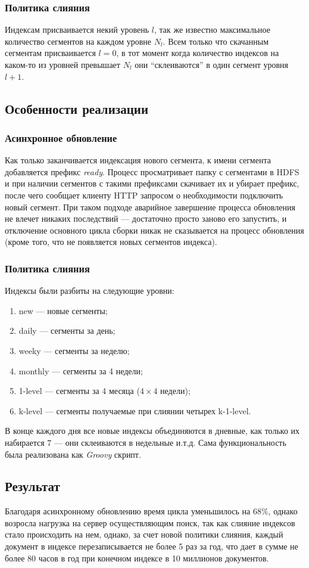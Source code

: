 \subsubsection{Политика слияния}
Индексам присваивается некий уровень $l$, так же известно максимальное количество сегментов на каждом уровне $N_{l}$. Всем только что скачанным сегментам присваивается $l=0$, в тот момент когда количество индексов на каком-то из уровней превышает $N_{l}$ они ``склеиваются'' в один сегмент уровня $l+1$.
\subsection{Особенности реализации}
\subsubsection{Асинхронное обновление}
Как только заканчивается индексация нового сегмента, к имени сегмента добавляется префикс \textit{ready}. Процесс просматривает папку с сегментами в HDFS и при наличии сегментов с такими префиксами скачивает их и убирает префикс, после чего сообщает клиенту HTTP запросом о необходимости подключить новый сегмент. При таком подходе аварийное завершение процесса обновления не влечет никаких последствий --- достаточно просто заново его запустить, и отключение основного цикла сборки никак не сказывается на процесс обновления (кроме того, что не появляется новых сегментов индекса).
\subsubsection{Политика слияния}
Индексы были разбиты на следующие уровни:
\begin{enumerate}
 \item new --- новые сегменты;
 \item daily --- сегменты за день;
 \item weeky --- сегменты за неделю;
 \item monthly --- сегменты за 4 недели;
 \item 1-level --- сегменты за 4 месяца ($4\times4$ недели);
 \item k-level --- сегменты получаемые при слиянии четырех k-1-level.
\end{enumerate}
В конце каждого дня все новые индексы объединяются в дневные, как только их набирается 7 --- они склеиваются в недельные и.т.д. Сама функциональность была реализована как \textit{Groovy} скрипт.
\subsection{Результат}
Благодаря асинхронному обновлению время цикла уменьшилось на 68\%, однако возросла нагрузка на сервер осуществляющим поиск, так как слияние индексов стало происходить на нем, однако, за счет новой политики слияния, каждый документ в индексе перезаписывается не более 5 раз за год, что дает в сумме не более 80 часов в год при конечном индексе в 10 миллионов документов.
 
